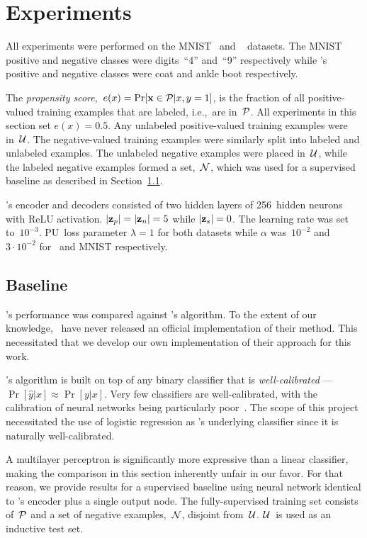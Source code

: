 \section{Experiments}

All experiments were performed on the MNIST~\cite{LeCun:1998} and \fashmnist~\cite{FashionMNIST} datasets. The  MNIST positive and negative classes were digits~``4'' and~``9'' respectively while \fashmnist's positive and negative classes were coat and ankle boot respectively.

The \textit{propensity score},~${e(x)=\Pr[\mathbf{x}\in\mathcal{P}\vert x,y=1]}$, is the fraction of all positive-valued training examples that are labeled, i.e.,~are in~$\mathcal{P}$.  All experiments in this section set ${e(x)=0.5}$. Any unlabeled positive-valued training examples were in~$\mathcal{U}$.  The negative-valued training examples were similarly split into labeled and unlabeled examples.  The unlabeled negative examples were placed in~$\mathcal{U}$, while the labeled negative examples formed a set,~$\mathcal{N}$, which was used for a supervised baseline as described in Section~\ref{sec:Experiments:Baseline}.

\toolname's encoder and decoders consisted of two hidden layers of 256~hidden neurons with ReLU activation.  $\lvert\mathbf{z}_{p}\rvert=\lvert\mathbf{z}_{n}\rvert=5$ while ${\lvert\mathbf{z}_{s}\rvert=0}$.  The learning rate was set to~$10^{-3}$. PU~loss parameter ${\lambda=1}$ for both datasets while ${\alpha}$ was~$10^{-2}$ and ${3\cdot10^{-2}}$ for \fashmnist\ and MNIST respectively.

\subsection{Baseline}\label{sec:Experiments:Baseline}

\toolname's performance was compared against \elkan's algorithm.  To the extent of our knowledge, \elkan\ have never released an official implementation of their method. This necessitated that we develop our own implementation of their approach for this work.

\elkan's algorithm is built on top of any binary classifier that is \textit{well-calibrated} ---~${\Pr[\hat{y} \vert x] \approx \Pr[y \vert x]}$.  Very few classifiers are well-calibrated, with the calibration of neural networks being particularly poor~\cite{Guo:2017}.  The scope of this project necessitated the use of logistic regression as \elkan's underlying classifier since it is naturally well-calibrated.

A multilayer perceptron is significantly more expressive than a linear classifier, making the comparison in this section inherently unfair in our favor. For that reason, we provide results for a supervised baseline using neural network identical to \toolname's encoder plus a single output node.  The fully-supervised training set consists of~$\mathcal{P}$ and a set of negative examples,~$\mathcal{N}$, disjoint from~$\mathcal{U}$.  $\mathcal{U}$~is used as an inductive test set.

